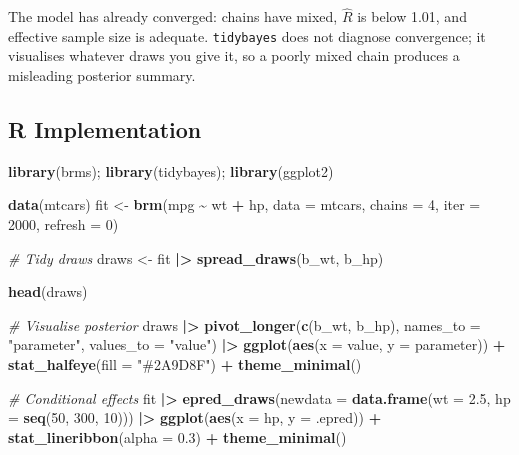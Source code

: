 \documentclass[
]{article}
\newenvironment{Shaded}{\begin{snugshade}}{\end{snugshade}}
\newcommand{\AttributeTok}[1]{\textcolor[rgb]{0.13,0.29,0.53}{#1}}
\newcommand{\CommentTok}[1]{\textcolor[rgb]{0.56,0.35,0.01}{\textit{#1}}}
\newcommand{\DecValTok}[1]{\textcolor[rgb]{0.00,0.00,0.81}{#1}}
\newcommand{\FloatTok}[1]{\textcolor[rgb]{0.00,0.00,0.81}{#1}}
\newcommand{\FunctionTok}[1]{\textcolor[rgb]{0.13,0.29,0.53}{\textbf{#1}}}
\newcommand{\NormalTok}[1]{#1}
\newcommand{\OtherTok}[1]{\textcolor[rgb]{0.56,0.35,0.01}{#1}}
\newcommand{\SpecialCharTok}[1]{\textcolor[rgb]{0.81,0.36,0.00}{\textbf{#1}}}
\newcommand{\StringTok}[1]{\textcolor[rgb]{0.31,0.60,0.02}{#1}}
\begin{document}
The model has already converged: chains have mixed, \(\hat R\) is below
1.01, and effective sample size is adequate. \texttt{tidybayes} does not
diagnose convergence; it visualises whatever draws you give it, so a
poorly mixed chain produces a misleading posterior summary.

\subsection{R Implementation}\label{r-implementation}

\begin{Shaded}
\begin{Highlighting}[]
\FunctionTok{library}\NormalTok{(brms); }\FunctionTok{library}\NormalTok{(tidybayes); }\FunctionTok{library}\NormalTok{(ggplot2)}

\FunctionTok{data}\NormalTok{(mtcars)}
\NormalTok{fit }\OtherTok{\textless{}{-}} \FunctionTok{brm}\NormalTok{(mpg }\SpecialCharTok{\textasciitilde{}}\NormalTok{ wt }\SpecialCharTok{+}\NormalTok{ hp, }\AttributeTok{data =}\NormalTok{ mtcars, }\AttributeTok{chains =} \DecValTok{4}\NormalTok{, }\AttributeTok{iter =} \DecValTok{2000}\NormalTok{, }\AttributeTok{refresh =} \DecValTok{0}\NormalTok{)}

\CommentTok{\# Tidy draws}
\NormalTok{draws }\OtherTok{\textless{}{-}}\NormalTok{ fit }\SpecialCharTok{|\textgreater{}}
  \FunctionTok{spread\_draws}\NormalTok{(b\_wt, b\_hp)}

\FunctionTok{head}\NormalTok{(draws)}

\CommentTok{\# Visualise posterior}
\NormalTok{draws }\SpecialCharTok{|\textgreater{}}
  \FunctionTok{pivot\_longer}\NormalTok{(}\FunctionTok{c}\NormalTok{(b\_wt, b\_hp), }\AttributeTok{names\_to =} \StringTok{"parameter"}\NormalTok{, }\AttributeTok{values\_to =} \StringTok{"value"}\NormalTok{) }\SpecialCharTok{|\textgreater{}}
  \FunctionTok{ggplot}\NormalTok{(}\FunctionTok{aes}\NormalTok{(}\AttributeTok{x =}\NormalTok{ value, }\AttributeTok{y =}\NormalTok{ parameter)) }\SpecialCharTok{+}
  \FunctionTok{stat\_halfeye}\NormalTok{(}\AttributeTok{fill =} \StringTok{"\#2A9D8F"}\NormalTok{) }\SpecialCharTok{+}
  \FunctionTok{theme\_minimal}\NormalTok{()}

\CommentTok{\# Conditional effects}
\NormalTok{fit }\SpecialCharTok{|\textgreater{}}
  \FunctionTok{epred\_draws}\NormalTok{(}\AttributeTok{newdata =} \FunctionTok{data.frame}\NormalTok{(}\AttributeTok{wt =} \FloatTok{2.5}\NormalTok{, }\AttributeTok{hp =} \FunctionTok{seq}\NormalTok{(}\DecValTok{50}\NormalTok{, }\DecValTok{300}\NormalTok{, }\DecValTok{10}\NormalTok{))) }\SpecialCharTok{|\textgreater{}}
  \FunctionTok{ggplot}\NormalTok{(}\FunctionTok{aes}\NormalTok{(}\AttributeTok{x =}\NormalTok{ hp, }\AttributeTok{y =}\NormalTok{ .epred)) }\SpecialCharTok{+}
  \FunctionTok{stat\_lineribbon}\NormalTok{(}\AttributeTok{alpha =} \FloatTok{0.3}\NormalTok{) }\SpecialCharTok{+}
  \FunctionTok{theme\_minimal}\NormalTok{()}
\end{Highlighting}
\end{Shaded}
\end{document}
